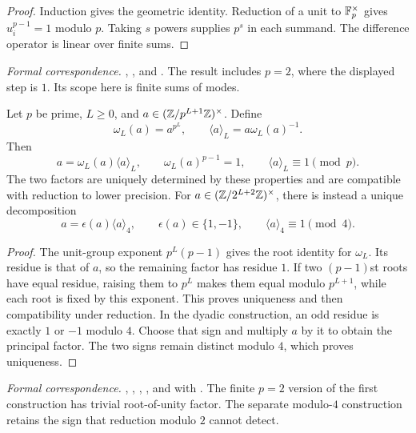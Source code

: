 \begin{proof}
Induction gives the geometric identity. Reduction of a unit to $\mathbb F_p^\times$
gives $u_i^{p-1}=1$ modulo $p$. Taking $s$ powers supplies $p^s$ in each
summand. The difference operator is linear over finite sums.
\end{proof}

\begingroup\small\raggedright
\noindent\emph{Formal correspondence.}
,
, and
.
The result includes $p=2$, where the displayed step is $1$. Its scope here
is finite sums of modes.
\par\endgroup

\begin{theorem}
\label{thm:finite-unit-foundation}
Let $p$ be prime, $L\geq0$, and
$a\in(\mathbb Z/p^{L+1}\mathbb Z)^\times$. Define
\[
\omega_L(a)=a^{p^L},\qquad \langle a\rangle_L=a\omega_L(a)^{-1}.
\]
Then
\[
a=\omega_L(a)\langle a\rangle_L,\qquad
\omega_L(a)^{p-1}=1,\qquad \langle a\rangle_L\equiv1\pmod p.
\]
The two factors are uniquely determined by these properties and are compatible
with reduction to lower precision.
For $a\in(\mathbb Z/2^{L+2}\mathbb Z)^\times$, there is instead a unique decomposition
\[
a=\epsilon(a)\langle a\rangle_4,
\qquad \epsilon(a)\in\{1,-1\},\qquad
\langle a\rangle_4\equiv1\pmod4.
\]
\end{theorem}

\begin{proof}
The unit-group exponent $p^L(p-1)$ gives the root identity for $\omega_L$.
Its residue is that of $a$, so the remaining factor has residue $1$.
If two $(p-1)$st roots have equal residue, raising them to $p^L$ makes them
equal modulo $p^{L+1}$, while each root is fixed by this exponent. This proves
uniqueness and then compatibility under reduction. In the dyadic construction,
an odd residue is exactly $1$ or $-1$ modulo $4$. Choose that sign and multiply
$a$ by it to obtain the principal factor. The two signs remain distinct
modulo $4$, which proves uniqueness.
\end{proof}

\begingroup\small\raggedright
\noindent\emph{Formal correspondence.}
,
,
,
, and
 with
.
The finite $p=2$ version of the first construction has trivial root-of-unity
factor. The separate modulo-$4$ construction retains the sign that reduction
modulo $2$ cannot detect.
\par\endgroup

